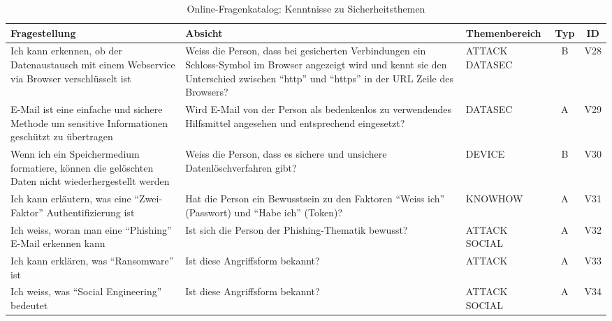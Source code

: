 \documentclass[../../main.tex]{subfiles}
\begin{document}

\sloppy 

\begin{table}[H]
\tablefontsize	
\centering
\caption{Online-Fragenkatalog: Kenntnisse zu Sicherheitsthemen}
\label{Kenntnisse zu Sicherheitsthemen}
\begin{tabular}{ |p{5.5cm}|p{5.5cm}|p{2.5cm}|c|c|}

\hline
\tableheaderbgcolor
\textbf{Fragestellung} & \textbf{Absicht} & \textbf{Themenbereich} & \textbf{Typ} & \textbf{ID}\\ 
\hline

Ich kann erkennen, ob der Datenaustausch mit einem Webservice via Browser verschlüsselt ist & Weiss die Person, dass bei gesicherten Verbindungen ein Schloss-Symbol im Browser angezeigt wird und kennt sie  den Unterschied zwischen "`http"' und "`https"' in der URL Zeile des Browsers? & ATTACK \newline DATASEC & B & V28 \\
\hline

E-Mail ist eine einfache und sichere Methode um sensitive Informationen geschützt zu übertragen & Wird E-Mail von der Person als bedenkenlos zu verwendendes Hilfsmittel angesehen und entsprechend eingesetzt? & DATASEC & A & V29 \\
\hline

Wenn ich ein Speichermedium formatiere, können die gelöschten Daten nicht wiederhergestellt werden & Weiss die Person, dass es sichere und unsichere Datenlöschverfahren gibt? & DEVICE & B & V30 \\
\hline

Ich kann erläutern, was eine "`Zwei-Faktor"' Authentifizierung ist & Hat die Person ein Bewusstsein zu den Faktoren "`Weiss ich"' (Passwort) und "`Habe ich"' (Token)? & KNOWHOW & A & V31 \\
\hline

Ich weiss, woran man eine "`Phishing"' E-Mail erkennen kann & Ist sich die Person der Phishing-Thematik bewusst? & ATTACK \newline SOCIAL & A & V32 \\
\hline

Ich kann erklären, was "`Ransomware"' ist & Ist diese Angriffsform bekannt? & ATTACK & A & V33 \\
\hline

Ich weiss, was "`Social Engineering"' bedeutet & Ist diese Angriffsform bekannt? & ATTACK \newline SOCIAL & A & V34 \\
\hline

\end{tabular}
\end{table}
\end{document}
